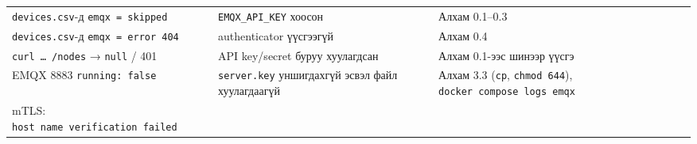 \begin{longtable}[]{@{}lll@{}}
\begin{minipage}[t]{0.30\columnwidth}
\texttt{devices.csv}-д \texttt{emqx\ =\ skipped}\strut
\end{minipage} & \begin{minipage}[t]{0.30\columnwidth}\raggedright
\texttt{EMQX\_\allowbreak{}API\_\allowbreak{}KEY} хоосон\strut
\end{minipage} & \begin{minipage}[t]{0.30\columnwidth}\raggedright
Алхам 0.1--0.3\strut
\end{minipage}\tabularnewline
\begin{minipage}[t]{0.30\columnwidth}\raggedright
\texttt{devices.csv}-д \texttt{emqx\ =\allowbreak{}\ error\ 404}\strut
\end{minipage} & \begin{minipage}[t]{0.30\columnwidth}\raggedright
authenticator үүсгээгүй\strut
\end{minipage} & \begin{minipage}[t]{0.30\columnwidth}\raggedright
Алхам 0.4\strut
\end{minipage}\tabularnewline
\begin{minipage}[t]{0.30\columnwidth}\raggedright
\texttt{curl\ \ldots{}\ /\allowbreak{}nodes} → \texttt{null} / 401\strut
\end{minipage} & \begin{minipage}[t]{0.30\columnwidth}\raggedright
API key/secret буруу хуулагдсан\strut
\end{minipage} & \begin{minipage}[t]{0.30\columnwidth}\raggedright
Алхам 0.1-ээс шинээр үүсгэ\strut
\end{minipage}\tabularnewline
\begin{minipage}[t]{0.30\columnwidth}\raggedright
EMQX 8883 \texttt{running:\ false}\strut
\end{minipage} & \begin{minipage}[t]{0.30\columnwidth}\raggedright
\texttt{server.key} уншигдахгүй эсвэл файл хуулагдаагүй\strut
\end{minipage} & \begin{minipage}[t]{0.30\columnwidth}\raggedright
Алхам 3.3 (\texttt{cp}, \texttt{chmod\ 644}), \texttt{docker\ compose\ logs\ emqx}\strut
\end{minipage}\tabularnewline
\begin{minipage}[t]{0.30\columnwidth}\raggedright
mTLS: \texttt{host\ name\ verification\ failed}\strut
\end{minipage} & \begin{minipage}[t]{0.30\columnwidth}\raggedright

\end{minipage}
\end{longtable}
